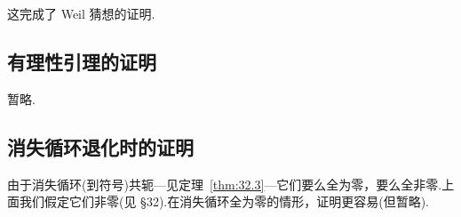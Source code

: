 这完成了 Weil 猜想的证明.

\subsection*{有理性引理的证明}

暂略.

\subsection*{消失循环退化时的证明}

由于消失循环(到符号)共轭---见定理~\ref{thm:32.3}---它们要么全为零，要么全非零.上面我们假定它们非零(见 \S 32).在消失循环全为零的情形，证明更容易(但暂略).

